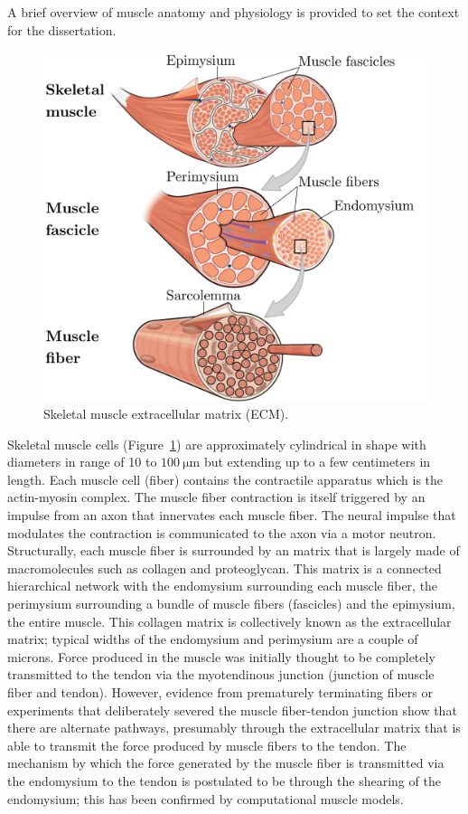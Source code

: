 A brief overview of muscle anatomy and physiology is provided to set the context for the dissertation. 
\begin{figure}[!ht]
\centering
\includegraphics[scale=.35]{Figures/FIBER.pdf}
\caption[Skeletal muscle extracellular matrix]{Skeletal muscle extracellular matrix (ECM).}
\label{fig: ECM}
\end{figure}
Skeletal muscle cells (Figure~\ref{fig: ECM}) are approximately cylindrical in shape with diameters in range of 10 to $\SI{100}{\micro\meter}$ but extending up to a few centimeters in length. 
Each muscle cell (fiber) contains the contractile apparatus which is the actin-myosin complex. 
The muscle fiber contraction is itself triggered by an impulse from an axon that innervates each muscle fiber. 
The neural impulse that modulates the contraction is communicated to the axon via a motor neutron. 
Structurally, each muscle fiber is surrounded by an matrix that is largely made of macromolecules such as collagen and proteoglycan. 
This matrix is a connected hierarchical network with the endomysium surrounding each muscle fiber, the perimysium surrounding a bundle of muscle fibers (fascicles) and the epimysium, the entire muscle. 
This collagen matrix is collectively known as the extracellular matrix; typical widths of the endomysium and perimysium are a couple of microns. 
Force produced in the muscle was initially thought to be completely transmitted to the tendon via the myotendinous junction (junction of muscle fiber and tendon). 
However, evidence from prematurely terminating fibers or experiments that deliberately severed the muscle fiber-tendon junction show that there are alternate pathways, presumably through the extracellular matrix that is able to transmit the force produced by muscle fibers to the tendon. 
The mechanism by which the force generated by the muscle fiber is transmitted via the endomysium to the tendon is postulated to be through the shearing of the endomysium; this has been confirmed by computational muscle models. 

